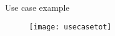 \begin{frame}{Use case example}

  \begin{figure}
    \centering
    \texttt{[image: usecasetot]}
  \end{figure}

\end{frame}